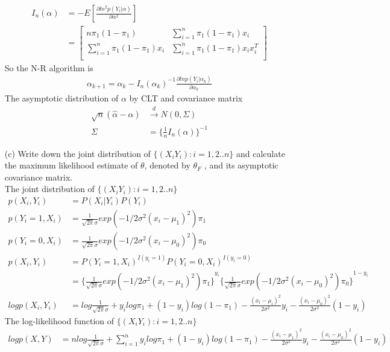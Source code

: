 \documentclass[11pt]{article} %
\begin{document}
\begin{itemize}
\begin{align*}
		I_n(\alpha) &= -E[ \frac{\partial ln^2 p(Y_i|\alpha)}{\partial \alpha^2}]\\
		&= \begin{bmatrix}
			n \pi_1 (1-\pi_1) &   \sum_{i=1}^n \pi_1 (1-\pi_1)x_i\\
			\sum_{i=1}^n \pi_1 (1-\pi_1)x_i &  \sum_{i=1}^n \pi_1 (1-\pi_1)x_ix_i^T\\
		\end{bmatrix}
	\end{align*}  
	So the N-R algorithm is 
	\begin{align*}
		\alpha_{k+1} = \alpha_{k} - I_n(\alpha_k)^{-1} \frac{\partial ln p(Y_i|\alpha_k)}{\partial \alpha_k}
	\end{align*}      
	The asymptotic distribution of $\alpha$ by CLT and covariance matrix 
	\begin{align*}
		\sqrt{n} (\hat{\alpha} - \alpha) & \xrightarrow[]{d} N \left(0, \Sigma \right) \\
		\Sigma & = \{ \frac{1}{n} I_n(\alpha) \}^{-1}
	\end{align*} 
	\item[(c)] Write down the joint distribution of $\{(X_i Y_i): i=1,2..n \}$ and calculate the
	maximum likelihood estimate of $\theta$, denoted by $\theta_F$ , and its asymptotic covariance
	matrix.\\
	The joint distribution of $\{(X_i Y_i): i=1,2..n \}$
	\begin{align*}
		p(X_i, Y_i) &= P(X_i|Y_i) P(Y_i) \\
		p(Y_i=1, X_i) &= \frac{1}{\sqrt{2\pi}\sigma} exp(-1/2\sigma^2 (x_i-\mu_1)^2) \pi_1\\
		p(Y_i=0, X_i) &=\frac{1}{\sqrt{2\pi}\sigma} exp(-1/2\sigma^2 (x_i-\mu_0)^2)  \pi_0\\
		p(X_i, Y_i) &= P(Y_i=1, X_i)^{I(y_i=1)} P(Y_i=0, X_i)^{I(y_i=0)}\\
		& = {\{\frac{1}{\sqrt{2\pi}\sigma} exp(-1/2\sigma^2 (x_i-\mu_1)^2) \pi_1\}}^{y_i} {\{\frac{1}{\sqrt{2\pi}\sigma} exp(-1/2\sigma^2 (x_i-\mu_0)^2)  \pi_0\}}^{1-y_i}\\
		log p(X_i, Y_i) &= log \frac{1}{\sqrt{2\pi}\sigma} + y_i log\pi_1 + (1-y_i) log(1-\pi_1) - \frac{(x_i-\mu_i)^2}{2\sigma^2} y_i - \frac{(x_i-\mu_0)^2}{2\sigma^2} (1-y_i)
	\end{align*} 
	The log-likelihood function of $\{(X_i Y_i): i=1,2..n \}$
	\begin{align*}
		log p(X, Y) &= nlog \frac{1}{\sqrt{2\pi}\sigma} + \sum_{i=1}^n y_i log\pi_1 + (1-y_i) log(1-\pi_1) - \frac{(x_i-\mu_1)^2}{2\sigma^2} y_i - \frac{(x_i-\mu_0)^2}{2\sigma^2} (1-y_i)

\end{align*}
\end{itemize}
\end{document}
